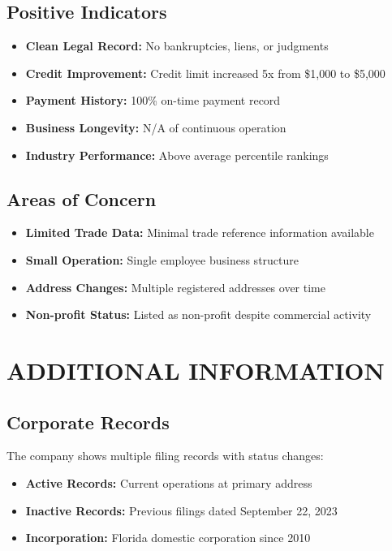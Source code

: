 \documentclass[11pt,a4paper]{article}
\begin{document}
\subsection{Positive Indicators}
\begin{itemize}[leftmargin=0.5cm]
    \item \textbf{Clean Legal Record:} No bankruptcies, liens, or judgments
    \item \textbf{Credit Improvement:} Credit limit increased 5x from \$1,000 to \$5,000
    \item \textbf{Payment History:} 100\% on-time payment record
    \item \textbf{Business Longevity:} N/A of continuous operation
    \item \textbf{Industry Performance:} Above average percentile rankings
\end{itemize}

\subsection{Areas of Concern}
\begin{itemize}[leftmargin=0.5cm]
    \item \textbf{Limited Trade Data:} Minimal trade reference information available
    \item \textbf{Small Operation:} Single employee business structure
    \item \textbf{Address Changes:} Multiple registered addresses over time
    \item \textbf{Non-profit Status:} Listed as non-profit despite commercial activity
\end{itemize}

\section{ADDITIONAL INFORMATION}

\subsection{Corporate Records}
The company shows multiple filing records with status changes:
\begin{itemize}
    \item \textbf{Active Records:} Current operations at primary address
    \item \textbf{Inactive Records:} Previous filings dated September 22, 2023
    \item \textbf{Incorporation:} Florida domestic corporation since 2010
\end{itemize}
\end{document}
